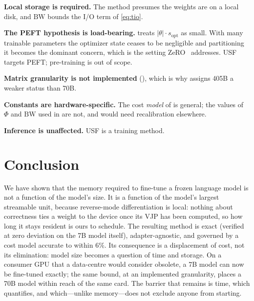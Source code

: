 \documentclass[journal]{IEEEtran}
\newcommand{\usf}{USF}
\begin{document}
\textbf{Local storage is required.} The method presumes the weights are on a local disk, and
$\mathrm{BW}$ bounds the I/O term of \eqref{eq:tio}.

\textbf{The PEFT hypothesis is load-bearing.}  treats $|\theta|\cdot s_{\text{opt}}$
as small. With many trainable parameters the optimizer state ceases to be negligible and
partitioning it becomes the dominant concern, which is the setting ZeRO~\cite{rajbhandari2020zero}
addresses. \usf{} targets PEFT; pre-training is out of scope.

\textbf{Matrix granularity is not implemented} (), which is why
 assigns 405B a weaker status than 70B.

\textbf{Constants are hardware-specific.} The cost \emph{model} of  is general; the
values of $\Phi$ and $\mathrm{BW}$ used in  are not, and would need
recalibration elsewhere.

\textbf{Inference is unaffected.} \usf{} is a training method.

\section{Conclusion}

We have shown that the memory required to fine-tune a frozen language model is not a function of
the model's size. It is a function of the model's largest streamable unit, because reverse-mode
differentiation is local: nothing about correctness ties a weight to the device once its VJP has
been computed, so how long it stays resident is ours to schedule. The resulting method is exact
(verified at zero deviation on the 7B model itself),
adapter-agnostic, and governed by a cost model accurate to within 6\%. Its consequence is a
displacement of cost, not its elimination: model size becomes a question of time and storage.
On a consumer GPU that a data-centre would consider obsolete, a 7B model can now be fine-tuned
exactly; the same bound, at an implemented granularity, places a 70B model within reach of the same
card. The barrier that remains is time, which  quantifies, and which---unlike
memory---does not exclude anyone from starting.



\end{document}
